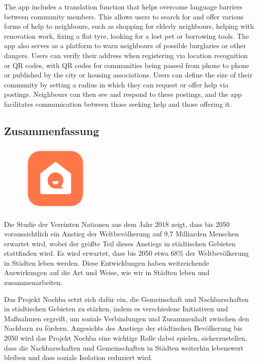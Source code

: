 The app includes a translation function that helps overcome language barriers between community members. This allows users to search for and offer various forms of help to neighbours, such as shopping for elderly neighbours, helping with renovation work, fixing a flat tyre, looking for a lost pet or borrowing tools. The app also serves as a platform to warn neighbours of possible burglaries or other dangers. Users can verify their address when registering via location recognition or QR codes, with QR codes for communities being passed from phone to phone or published by the city or housing associations. Users can define the size of their community by setting a radius in which they can request or offer help via postings. Neighbours can then see and respond to these postings, and the app facilitates communication between those seeking help and those offering it.
\newpage
\begin{spacing}{1}
    \chapter*{Zusammenfassung}
\end{spacing}
\begin{figure}
    \begin{center}
      \includegraphics[width=0.3\textwidth]{pics/app-logo.png}
    \end{center}
\end{figure}
Die Studie der Vereinten Nationen \cite{un2018world} aus dem Jahr 2018 zeigt, dass bis 2050 voraussichtlich ein Anstieg der Weltbevölkerung auf 9,7 Milliarden Menschen erwartet wird, wobei der größte Teil dieses Anstiegs in städtischen Gebieten stattfinden wird. Es wird erwartet, dass bis 2050 etwa 68\% der Weltbevölkerung in Städten leben werden. Diese Entwicklungen haben weitreichende Auswirkungen auf die Art und Weise, wie wir in Städten leben und zusammenarbeiten.

Das Projekt Nochba setzt sich dafür ein, die Gemeinschaft und Nachbarschaften in städtischen Gebieten zu stärken, indem es verschiedene Initiativen und Maßnahmen ergreift, um soziale Verbindungen und Zusammenhalt zwischen den Nachbarn zu fördern. Angesichts des Anstiegs der städtischen Bevölkerung bis 2050 wird das Projekt Nochba eine wichtige Rolle dabei spielen, sicherzustellen, dass die Nachbarschaften und Gemeinschaften in Städten weiterhin lebenswert bleiben und dass soziale Isolation reduziert wird.

